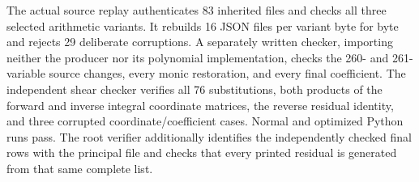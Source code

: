 The actual source replay authenticates 83 inherited files and checks all
three selected arithmetic variants. It rebuilds 16 JSON files per variant
byte for byte and rejects 29 deliberate corruptions. A separately written
checker, importing neither the producer nor its polynomial implementation,
checks the 260- and 261-variable source changes, every monic restoration,
and every final coefficient. The independent shear checker verifies all
76 substitutions, both products of the forward and inverse integral
coordinate matrices, the reverse residual identity, and three corrupted
coordinate/coefficient cases. Normal and optimized Python runs pass.
The root verifier additionally identifies the independently checked final
rows with the principal file and checks that every printed residual is
generated from that same complete list.
